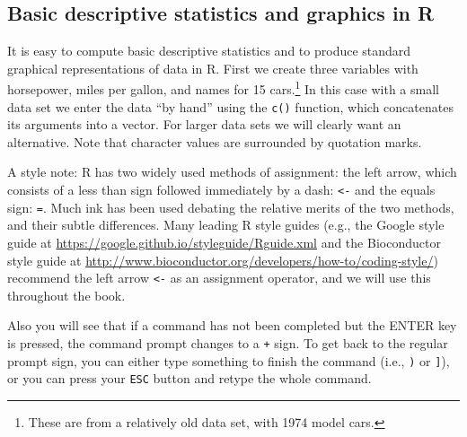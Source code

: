 \documentclass[
]{krantz}
\begin{document}
\hypertarget{dec}{%
\subsection{Basic descriptive statistics and graphics in R}\label{dec}}

It is easy to compute basic descriptive statistics and to produce standard graphical representations of data in R. First we create three variables with horsepower, miles per gallon, and names for 15 cars.\footnote{These are from a relatively old data set, with 1974 model cars.} In this case with a small data set we enter the data ``by hand'' using the \texttt{c()} function, which concatenates its arguments into a vector. For larger data sets we will clearly want an alternative. Note that character values are surrounded by quotation marks.

A style note: R has two widely used methods of assignment: the left arrow, which consists of a less than sign followed immediately by a dash: \texttt{\textless{}-} and the equals sign: \texttt{=}. Much ink has been used debating the relative merits of the two methods, and their subtle differences. Many leading R style guides (e.g., the Google style guide at \url{https://google.github.io/styleguide/Rguide.xml} and the Bioconductor style guide at \url{http://www.bioconductor.org/developers/how-to/coding-style/}) recommend the left arrow \texttt{\textless{}-} as an assignment operator, and we will use this throughout the book.

Also you will see that if a command has not been completed but the ENTER key is pressed, the command prompt changes to a \texttt{+} sign. To get back to the regular prompt sign, you can either type something to finish the command (i.e., \texttt{)} or \texttt{{]}}), or you can press your \texttt{ESC} button and retype the whole command.
\end{document}
